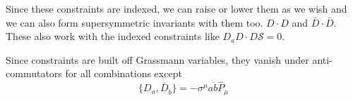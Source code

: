 Since these constraints are indexed, we can raise or lower them as we wish and we can also form supersymmetric invariants with them too. $D\cdot D$ and $\bar{D} \cdot \bar{D}$. These also work with the indexed constraints like $D_a D \cdot D \mathcal{S} = 0$.

Since constraints are built off Grassmann variables, they vanish under anti-commutators for all combinations except
\begin{equation}
    \{ D_a, \bar{D}_{\dot{b}} \} = - \sigma^\mu{a\dot{b}} \hat{P}_\mu
\end{equation}
